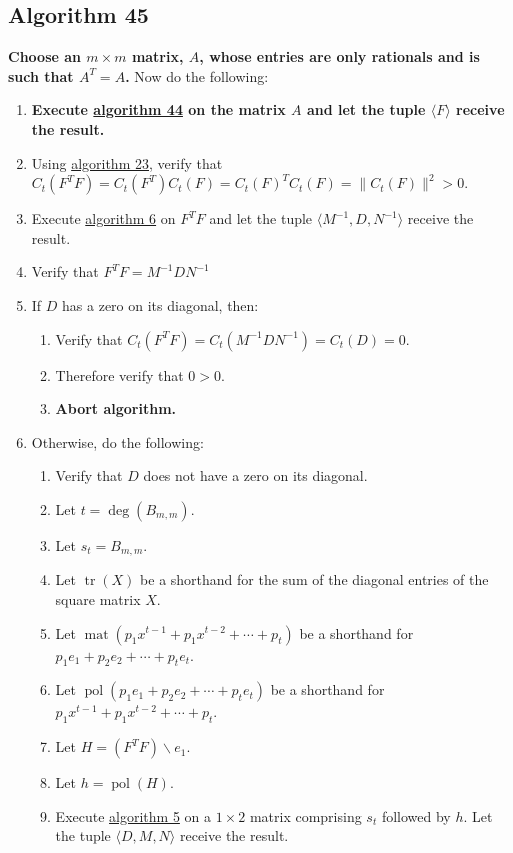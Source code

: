 \documentclass[twocolumn]{article}
\DeclareMathOperator{\mat}{mat}
\DeclareMathOperator{\pol}{pol}
\DeclareMathOperator{\tr}{tr}
\begin{document}
		\subsection{Algorithm 45}\label{sec:algorithm 45}
			\textbf{Choose an $m\times m$ matrix, $A$, whose entries are only rationals and is such that $A^T=A$.} Now do the following:
			\begin{enumerate}
				\item \textbf{Execute \hyperref[sec:algorithm 44]{algorithm 44} on the matrix $A$ and let the tuple $\langle F\rangle$ receive the result.}
				\item Using \hyperref[sec:algorithm 23]{algorithm 23}, verify that $C_t(F^TF)=C_t(F^T)C_t(F)={C_t(F)}^TC_t(F)=\lVert C_t(F)\rVert^2>0$.
				\item Execute \hyperref[sec:algorithm 6]{algorithm 6} on $F^TF$ and let the tuple $\langle M^{-1},D,N^{-1}\rangle$ receive the result.
				\item Verify that $F^TF=M^{-1}DN^{-1}$
				\item If $D$ has a zero on its diagonal, then:
				\begin{enumerate}
					\item Verify that $C_t(F^TF)=C_t(M^{-1}DN^{-1})=C_t(D)=0$.
					\item Therefore verify that $0>0$.
					\item \textbf{Abort algorithm.}
				\end{enumerate}
				\item Otherwise, do the following:
				\begin{enumerate}
					\item Verify that $D$ does not have a zero on its diagonal.
					\item Let $t=\deg(B_{m,m})$.
					\item Let $s_t=B_{m,m}$.
					\item Let $\tr(X)$ be a shorthand for the sum of the diagonal entries of the square matrix $X$.
					\item Let $\mat(p_1x^{t-1}+p_1x^{t-2}+\cdots+p_t)$ be a shorthand for $p_1e_1+p_2e_2+\cdots+p_te_t$.
					\item Let $\pol(p_1e_1+p_2e_2+\cdots+p_te_t)$ be a shorthand for $p_1x^{t-1}+p_1x^{t-2}+\cdots+p_t$.
					\item Let $H=(F^TF)\backslash e_1$.
					\item Let $h=\pol(H)$.
					\item Execute \hyperref[sec:algorithm 5]{algorithm 5} on a $1\times 2$ matrix comprising $s_t$ followed by $h$. Let the tuple $\langle D,M,N\rangle$ receive the result.

\end{enumerate}
\end{enumerate}
\end{document}
